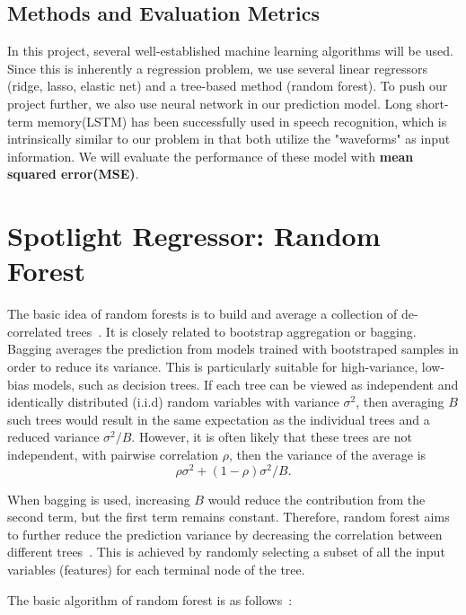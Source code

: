 \documentclass{article} %
\begin{document}
\subsection{Methods and Evaluation Metrics}

In this project, several well-established machine learning algorithms will be used. Since this is inherently a regression problem, we use several linear regressors (ridge, lasso, elastic net) and a tree-based method (random forest). To push our project further, we also use neural network in our prediction model. Long short-term memory(LSTM) has been successfully used in speech recognition, which is intrinsically similar to our problem in that both utilize the "waveforms" as input information.  We will evaluate the performance of these model with \textbf{mean squared error(MSE)}.

\section{Spotlight Regressor: Random Forest}

The basic idea of random forests is to build and average a collection of de-correlated trees~\cite{Breiman2001, hastie2008}. It is closely related to bootstrap aggregation or bagging. Bagging averages the prediction from models trained with bootstraped samples in order to reduce its variance. This is particularly suitable for high-variance, low-bias models, such as decision trees. If each tree can be viewed as independent and identically distributed (i.i.d) random variables with variance $\sigma^2$, then averaging $B$ such trees would result in the same expectation as the individual trees and a reduced variance $\sigma^2/B$. However, it is often likely that these trees are not independent, with pairwise correlation $\rho$, then the variance of the average is 
\begin{equation}\label{eq1}
\rho\sigma^2 + (1-\rho)\sigma^2/B. 
\end{equation}

When bagging is used, increasing $B$ would reduce the contribution from the second term, but the first term remains constant. Therefore, random forest aims to further reduce the prediction variance by decreasing the correlation between different trees~\cite{hastie2008}. This is achieved by randomly selecting a subset of all the input variables (features) for each terminal node of the tree.

The basic algorithm of random forest is as follows~\cite{hastie2008}:
\end{document}
